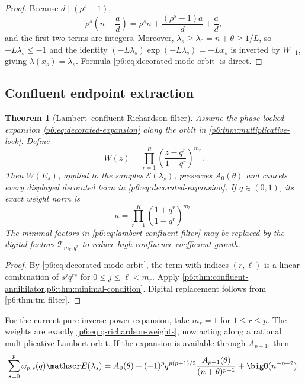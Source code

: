 \documentclass[11pt]{article}
\numberwithin{equation}{section}
\newtheorem{theorem}{Theorem}[section]
\theoremstyle{definition}
\theoremstyle{remark}
\begin{document}
\begin{proof}
Because $d\mid(\rho^s-1)$,
\[
 \rho^s\left(n+\frac ad\right)
 =\rho^sn+\frac{(\rho^s-1)a}{d}+\frac ad,
\]
and the first two terms are integers.  Moreover,
$\lambda_s\ge\lambda_0=n+\theta\ge1/L$, so
$-L\lambda_s\le-1$ and the identity
$(-L\lambda_s)\exp(-L\lambda_s)=-Lx_s$ is inverted by $W_{-1}$, giving
$\lambda(x_s)=\lambda_s$.  Formula \eqref{p6:eq:decorated-mode-orbit} is direct.
\end{proof}

\subsection{Confluent endpoint extraction}

\begin{theorem}[Lambert--confluent Richardson filter]
\label{p6:thm:lambert-confluent}
Assume the phase-locked expansion \eqref{p6:eq:decorated-expansion} along the orbit in
\cref{p6:thm:multiplicative-lock}.  Define
\begin{equation}
 W(z)=\prod_{r=1}^{R}
 \left(\frac{z-q^r}{1-q^r}\right)^{m_r}.
 \label{p6:eq:lambert-confluent-filter}
\end{equation}
Then $W(E_s)$, applied to the samples
$\mathscr E(\lambda_s)$, preserves $A_0(\theta)$ and cancels every displayed decorated
term in \eqref{p6:eq:decorated-expansion}.  If $q\in(0,1)$, its exact weight norm is
\begin{equation}
 \kappa
 =\prod_{r=1}^{R}\left(\frac{1+q^r}{1-q^r}\right)^{m_r}.
 \label{p6:eq:lambert-confluent-condition}
\end{equation}
The minimal factors in \eqref{p6:eq:lambert-confluent-filter} may be replaced by the digital
factors $\mathcal T_{m_r,q^r}$ to reduce high-confluence coefficient growth.
\end{theorem}

\begin{proof}
By \eqref{p6:eq:decorated-mode-orbit}, the term with indices $(r,\ell)$ is a linear
combination of $s^jq^{rs}$ for $0\le j\le\ell<m_r$.  Apply
\cref{p6:thm:confluent-annihilator,p6:thm:minimal-condition}.  Digital replacement follows from
\cref{p6:thm:tm-filter}.
\end{proof}

For the current pure inverse-power expansion, take $m_r=1$ for $1\le r\le p$.  The
weights are exactly \eqref{p6:eq:q-richardson-weights}, now acting along a rational
multiplicative Lambert orbit.  If the expansion is available through $A_{p+1}$, then
\begin{equation}
 \sum_{s=0}^{p}\omega_{p,s}(q)\mathscr E(\lambda_s)
 =A_0(\theta)
 +(-1)^pq^{p(p+1)/2}\frac{A_{p+1}(\theta)}{(n+\theta)^{p+1}}
 +\bigO(n^{-p-2}).
 \label{p6:eq:multiplicative-leading-error}
\end{equation}
\end{document}
